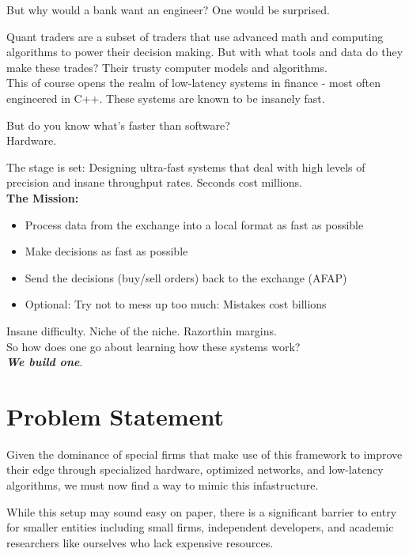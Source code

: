 \documentclass[12pt]{article}
\begin{document}
But why would a bank want an engineer?
One would be surprised.

Quant traders are a subset of traders that use advanced math and computing algorithms to power their decision making.
But with what tools and data do they make these trades? Their trusty computer models and algorithms.
\\ This of course opens the realm of low-latency systems in finance - most often engineered in C++.
These systems are known to be insanely fast.

But do you know what's faster than software? \\ Hardware.

The stage is set: Designing ultra-fast systems that deal with high levels of precision and insane throughput rates.
Seconds cost millions. 
\newline
\\ \textbf{The Mission:} 
\begin{itemize}
  \item Process data from the exchange into a local format as fast as possible
  \item Make decisions as fast as possible
  \item Send the decisions (buy/sell orders) back to the exchange (AFAP)
  \item Optional: Try not to mess up too much: Mistakes cost billions 
\end{itemize}

Insane difficulty.
Niche of the niche.
Razorthin margins.
\\ So how does one go about learning how these systems work? 
\newline
\\ \textbf{\emph{We build one}}.

\clearpage


\section*{Problem Statement}

Given the dominance of special firms that make use of this framework to improve their edge through specialized hardware, optimized networks, and low-latency algorithms, we must now find a way to mimic this infastructure. 

While this setup may sound easy on paper, there is a significant barrier to entry for smaller entities including small firms, independent developers, and academic researchers like ourselves who lack expensive resources.
\end{document}
